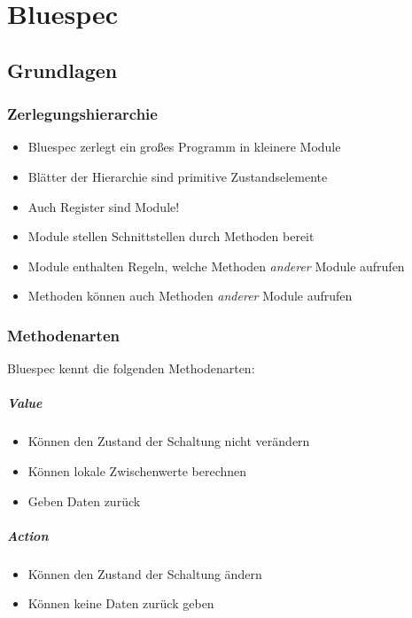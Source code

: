 \chapter{Bluespec}
	\section{Grundlagen}
		\subsection{Zerlegungshierarchie}
			\begin{itemize}
				\item Bluespec zerlegt ein großes Programm in kleinere Module
				\item Blätter der Hierarchie sind primitive Zustandselemente
				\item Auch Register sind Module!
				\item Module stellen Schnittstellen durch Methoden bereit
				\item Module enthalten Regeln, welche Methoden \textit{anderer} Module aufrufen
				\item Methoden können auch Methoden \textit{anderer} Module aufrufen
			\end{itemize}
		
		\subsection{Methodenarten}
			Bluespec kennt die folgenden Methodenarten:
			\paragraph{Value}
				\begin{itemize}
					\item Können den Zustand der Schaltung nicht verändern
					\item Können lokale Zwischenwerte berechnen
					\item Geben Daten zurück
				\end{itemize}
			
			\paragraph{Action}
				\begin{itemize}
					\item Können den Zustand der Schaltung ändern
					\item Können keine Daten zurück geben
				\end{itemize}
			
